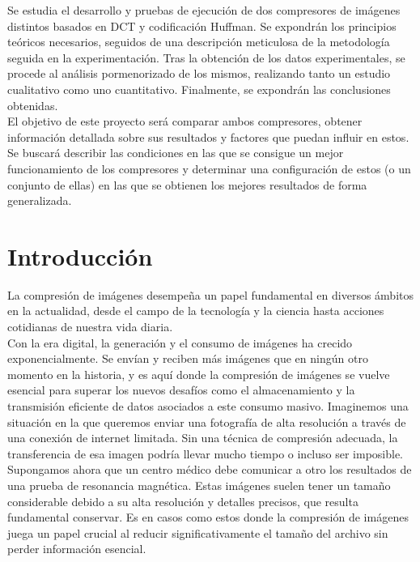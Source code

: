 \documentclass[12pt,a4paper]{article}
\begin{document}
Se estudia el desarrollo y pruebas de ejecución de dos compresores de imágenes distintos basados en DCT y codificación Huffman. Se expondrán los principios teóricos necesarios, seguidos de una descripción meticulosa de la metodología seguida en la experimentación. Tras la obtención de los datos experimentales, se procede al análisis pormenorizado de los mismos, realizando tanto un estudio cualitativo como uno cuantitativo. Finalmente, se expondrán las conclusiones obtenidas.\\

El objetivo de este proyecto será comparar ambos compresores, obtener información detallada sobre sus resultados y factores que puedan influir en estos. Se buscará describir las condiciones en las que se consigue un mejor funcionamiento de los compresores y determinar una configuración de estos (o un conjunto de ellas) en las que se obtienen los mejores resultados de forma generalizada.\\



\newpage
\section{Introducción}
La compresión de imágenes desempeña un papel fundamental en diversos ámbitos en la actualidad, desde el campo de la tecnología y la ciencia hasta acciones cotidianas de nuestra vida diaria.\\

Con la era digital, la generación y el consumo de imágenes ha crecido exponencialmente. Se envían y reciben más imágenes que en ningún otro momento en la historia, y es aquí donde la compresión de imágenes se vuelve esencial para superar los nuevos desafíos como el almacenamiento y la transmisión eficiente de datos asociados a este consumo masivo. Imaginemos una situación en la que queremos enviar una fotografía de alta resolución a través de una conexión de internet limitada. Sin una técnica de compresión adecuada, la transferencia de esa imagen podría llevar mucho tiempo o incluso ser imposible. Supongamos ahora que un centro médico debe comunicar a otro los resultados de una prueba de resonancia magnética. Estas imágenes suelen tener un tamaño considerable debido a su alta resolución y detalles precisos, que resulta fundamental conservar. Es en casos como estos donde la compresión de imágenes juega un papel crucial al reducir significativamente el tamaño del archivo sin perder información esencial.\\
\end{document}
